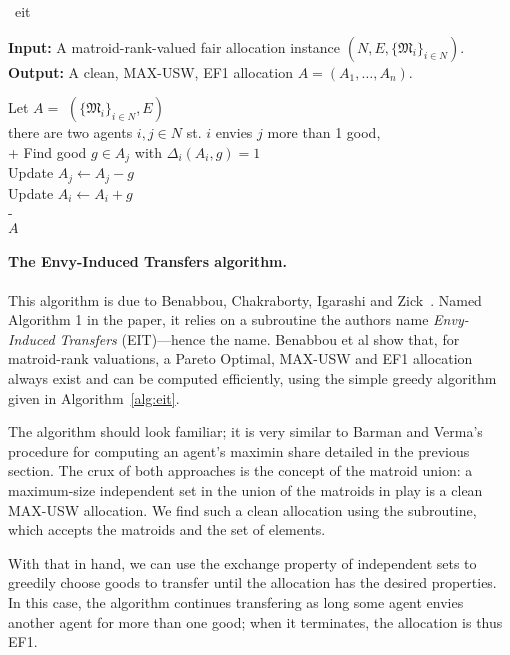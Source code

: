 \begin{algorithm}{~\cite{benabbou-2021}}{eit}

\textbf{Input:}  \tab A matroid-rank-valued fair allocation instance $(N, E, \{\mathfrak{M}_i\}_{i\in N})$.\\
\textbf{Output:} \tab A clean, MAX-USW, EF1 allocation $A = (A_1,\dots,A_n)$.

\begin{pseudo}[label=\small\arabic*, indent-mark]
    Let $A =$ $(\{\mathfrak{M}_i\}_{i\in N}, E)$  \\
     there are two agents $i,j\in N$ st. $i$ envies $j$ more than 1 good,   \\+
        Find good $g \in A_j$ with $\Delta_i(A_i, g) = 1$ \\
        Update $A_j \leftarrow A_j - g$ \\
        Update $A_i \leftarrow A_i + g$ \\-
     \\
     $A$
\end{pseudo}
  
\end{algorithm}

\paragraph{The Envy-Induced Transfers algorithm.} This algorithm is due to Benabbou, Chakraborty, Igarashi and Zick~\cite{benabbou-2021}. Named Algorithm 1 in the paper, it relies on a subroutine the authors name \textit{Envy-Induced Transfers} (EIT)---hence the name. Benabbou et al show that, for matroid-rank valuations, a Pareto Optimal, MAX-USW and EF1 allocation always exist and can be computed efficiently, using the simple greedy algorithm given in Algorithm~\ref{alg:eit}.

The algorithm should look familiar; it is very similar to Barman and Verma's procedure for computing an agent's maximin share detailed in the previous section. The crux of both approaches is the concept of the matroid union: a maximum-size independent set in the union of the matroids in play is a clean MAX-USW allocation. We find such a clean allocation using the  subroutine, which accepts the matroids and the set of elements.

With that in hand, we can use the exchange property of independent sets to greedily choose goods to transfer until the allocation has the desired properties. In this case, the algorithm continues transfering as long some agent envies another agent for more than one good; when it terminates, the allocation is thus EF1.

